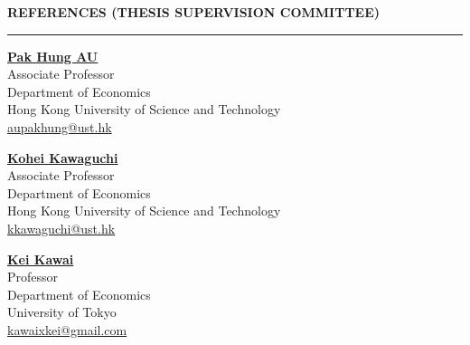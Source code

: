 \documentclass[11pt,letterpaper]{article}
\newcommand{\sectionheader}[1]{%
  \vspace{0.5em}
  {\large\bfseries #1}\\[-0.15em]
  \rule{\textwidth}{0.4pt}\par
  \vspace{0.22em}
}
\begin{document}
\sectionheader{REFERENCES (THESIS SUPERVISION COMMITTEE)}
{
\noindent
\begin{minipage}[t]{0.48\textwidth}
\textbf{\href{https://aupakhung.weebly.com/}{Pak Hung AU}}\\
Associate Professor\\
Department of Economics\\
Hong Kong University of Science and Technology\\
\href{mailto:aupakhung@ust.hk}{aupakhung@ust.hk}
\end{minipage}\hfill
\begin{minipage}[t]{0.48\textwidth}
\textbf{\href{https://www.kohei-kawaguchi.com/}{Kohei Kawaguchi}}\\
Associate Professor\\
Department of Economics\\
Hong Kong University of Science and Technology\\
\href{mailto:kkawaguchi@ust.hk}{kkawaguchi@ust.hk}
\end{minipage}

\vspace{0.9em}
\noindent
\begin{minipage}[t]{0.48\textwidth}
\textbf{\href{https://www.e.u-tokyo.ac.jp/fservice/faculty/kawai/kawai-e/kawai01-e.html}{Kei Kawai}}\\
Professor\\
Department of Economics\\
University of Tokyo\\
\href{mailto:kawaixkei@gmail.com}{kawaixkei@gmail.com}
\end{minipage}
}
\end{document}
